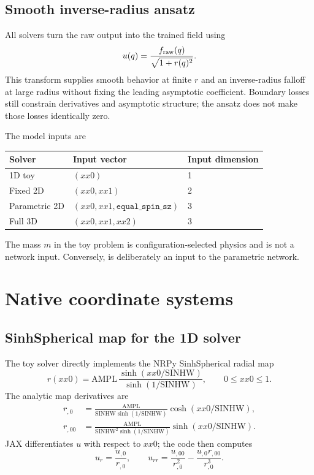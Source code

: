 \documentclass[11pt]{article}
\newcommand{\code}[1]{\texttt{\detokenize{#1}}}
\begin{document}
\subsection{Smooth inverse-radius ansatz}

All solvers turn the raw output into the trained field using
\begin{equation}
  u(q)=\frac{f_{\rm raw}(q)}{\sqrt{1+r(q)^2}}.
  \label{eq:output-transform}
\end{equation}
This transform supplies smooth behavior at finite $r$ and an inverse-radius
falloff at large radius without fixing the leading asymptotic coefficient.
Boundary losses still constrain derivatives and asymptotic structure; the
ansatz does not make those losses identically zero.

The model inputs are
\begin{center}
\begin{tabular}{lll}
\toprule
Solver & Input vector & Input dimension \\
\midrule
1D toy & $(xx0)$ & 1 \\
Fixed 2D & $(xx0,xx1)$ & 2 \\
Parametric 2D & $(xx0,xx1,\texttt{equal\_spin\_sz})$ & 3 \\
Full 3D & $(xx0,xx1,xx2)$ & 3 \\
\bottomrule
\end{tabular}
\end{center}

The mass $m$ in the toy problem is configuration-selected physics and is not
a network input.  Conversely, \code{equal_spin_sz} is deliberately an input
to the parametric network.

\section{Native coordinate systems}

\subsection{SinhSpherical map for the 1D solver}

The toy solver directly implements the NRPy SinhSpherical radial map
\begin{equation}
 r(xx0)=\mathrm{AMPL}\,
 \frac{\sinh(xx0/\mathrm{SINHW})}{\sinh(1/\mathrm{SINHW})},
 \qquad 0\leq xx0\leq1.
 \label{eq:sinh-spherical}
\end{equation}
The analytic map derivatives are
\begin{align}
 r_{,0} &=
 \frac{\mathrm{AMPL}}{\mathrm{SINHW}\sinh(1/\mathrm{SINHW})}
 \cosh(xx0/\mathrm{SINHW}),\\
 r_{,00} &=%
 \frac{\mathrm{AMPL}}{\mathrm{SINHW}^{2}\sinh(1/\mathrm{SINHW})}
 \sinh(xx0/\mathrm{SINHW}).
\end{align}
JAX differentiates $u$ with respect to $xx0$; the code then computes
\begin{equation}
 u_r=\frac{u_{,0}}{r_{,0}},\qquad
 u_{rr}=\frac{u_{,00}}{r_{,0}^{2}}
         -\frac{u_{,0}r_{,00}}{r_{,0}^{3}}.
 \label{eq:radial-chain-rule}
\end{equation}
\end{document}
